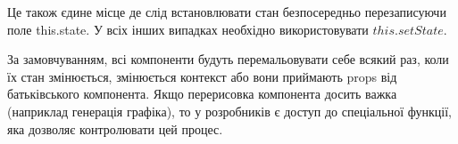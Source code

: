 Це також єдине місце де слід встановлювати стан безпосередньо перезаписуючи поле this.state. У всіх інших випадках необхідно використовувати $this.setState$.

За замовчуванням, всі компоненти будуть перемальовувати себе всякий раз, коли їх стан змінюється, змінюється контекст або вони приймають props від батьківського компонента. Якщо перерисовка компонента досить важка (наприклад генерація графіка), то у розробників є доступ до спеціальної функції, яка дозволяє контролювати цей процес.
